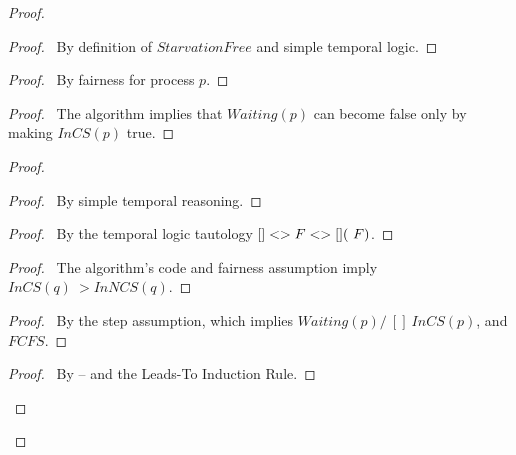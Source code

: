 \documentclass[fleqn,leqno]{article}
\begin{document}
\medskip
\pflongindent
\pflongnumbers
\beforePfSpace{0pt,.2em}
\afterPfSpace{0pt, .5em}
\interStepSpace{.5em}
\begin{proof}
\begin{proof}
\pf\ By definition of $StarvationFree$ and simple temporal logic.
\end{proof}

\begin{proof}
\pf\ By fairness for process $p$.
\end{proof}

\begin{proof}
\pf\ The algorithm implies that $Waiting(p)$ can become false only
by making $InCS(p)$ true.
\end{proof}

\begin{proof}
   \begin{proof}
   \pf\ By simple temporal reasoning.
   \end{proof}

   \begin{proof}
   \pf\ By the temporal logic tautology $[]<>F \/ <>[](~F)$.
   \end{proof}

   \begin{proof}
   \pf\ The algorithm's code and fairness assumption imply 
         $InCS(q) ~> InNCS(q)$.
   \end{proof}

   \begin{proof}
   \pf\ By the step  assumption, which implies
   $Waiting(p) /\ []~InCS(p)$, and $FCFS$.
   \end{proof}

   \qedstep
   \begin{proof}
   \pf\ By -- and the Leads-To Induction Rule.
   \end{proof}
\end{proof}


\end{proof}
\end{document}

